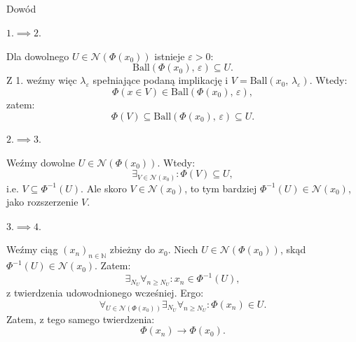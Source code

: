 \documentclass{article}
\numberwithin{defi}{section}
\numberwithin{theo}{section}
\numberwithin{defi}{section}
\newcommand{\N}{\mathbb{N}}
\newcommand{\eps}{\varepsilon}
\newcommand{\Nau}{\mathcal{N}}
\newcommand{\ciag}[1]{(#1_{n})_{n \in \N}}
\newcommand{\ball}[2]{\text{Ball}(#1, \, #2)}
\begin{document}
\begin{dow}{Dowód}
    \paragraph{$1. \implies 2.$}
    Dla dowolnego $U \in \Nau(\Phi(x_0))$ istnieje $\eps > 0$: \begin{equation*}
        \ball{\Phi(x_0)}{\eps} \subseteq U.
    \end{equation*} Z 1. weźmy więc $\lambda_\eps$ spełniające podaną implikację i $V = \ball{x_0}{\lambda_\eps}$. Wtedy: \begin{equation*}
        \Phi( x \in V) \in \ball{\Phi(x_0)}{\eps},
    \end{equation*} zatem: \begin{equation*}
        \Phi(V) \subseteq \ball{\Phi(x_0)}{\eps} \subseteq U.
    \end{equation*}

    \paragraph{$2. \implies 3.$}
    Weźmy dowolne $U \in \Nau(\Phi(x_0))$. Wtedy: \begin{equation*}
        \exists_{V \in \Nau(x_0)}: \Phi(V) \subseteq U,
    \end{equation*} i.e. $V \subseteq \Phi^{-1}(U)$. Ale skoro $V \in \Nau(x_0)$, to tym bardziej $\Phi^{-1}(U) \in \Nau(x_0)$, jako rozszerzenie $V$.

    \paragraph{$3. \implies 4.$}
    Weźmy ciąg $\ciag{x}$ zbieżny do $x_0$. Niech $U \in \Nau(\Phi(x_0))$, skąd $\Phi^{-1}(U) \in \Nau(x_0)$. Zatem: \begin{equation*}
        \exists_{N_U} \forall_{n \geqslant N_U}: x_n \in \Phi^{-1}(U),
    \end{equation*} z twierdzenia udowodnionego wcześniej. %
    Ergo: \begin{equation*}
        \forall_{U \in \Nau(\Phi(x_0))} \exists_{N_U} \forall_{n \geqslant N_U}: \Phi(x_n) \in U.
    \end{equation*} Zatem, z tego samego twierdzenia: \begin{equation*}
        \Phi(x_n) \to \Phi(x_0).
    \end{equation*}


\end{dow}
\end{document}

